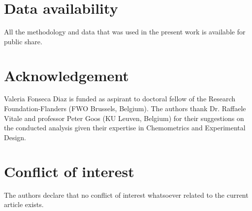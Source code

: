 \documentclass[preprint,12pt]{elsarticle}
\begin{document}
\section{Data availability}

All the methodology and data that was used in the present work is available for public share. 


\section{Acknowledgement}

Valeria Fonseca Diaz is funded as aspirant to doctoral fellow of
the Research Foundation-Flanders (FWO Brussels, Belgium).
The authors thank Dr. Raffaele Vitale and professor Peter Goos (KU Leuven, Belgium) for their suggestions on the conducted analysis given their expertise in Chemometrics and Experimental Design. 


\section{Conflict of interest}

The authors declare that no conflict of interest whatsoever related to the current article exists.




 

\end{document}

